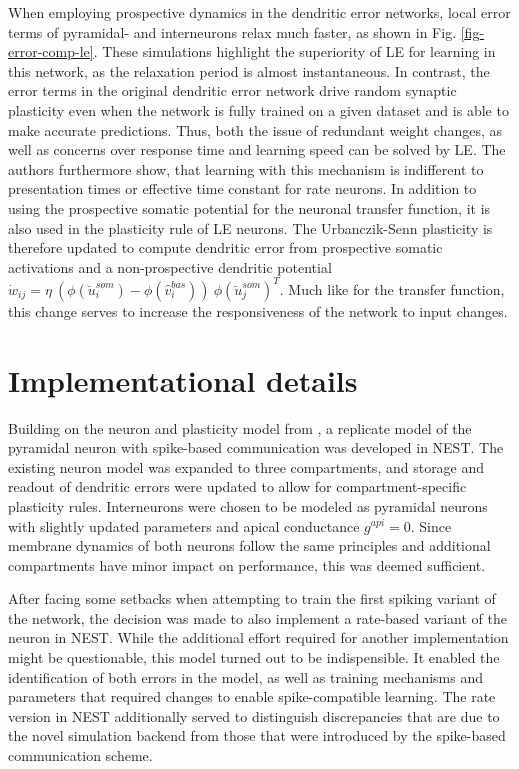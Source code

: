 When employing prospective dynamics in the dendritic error networks, local error terms of pyramidal- and interneurons
relax much faster, as shown in Fig. \ref{fig-error-comp-le}. These simulations highlight the superiority of LE for
learning in this network, as the relaxation period is almost instantaneous. In contrast, the error terms in the original
dendritic error network drive random synaptic plasticity even when the network is fully trained on a given dataset and
is able to make accurate predictions. Thus, both the issue of redundant weight changes, as well as concerns over
response time and learning speed can be solved by LE. The authors furthermore show, that learning with this mechanism is
indifferent to presentation times or effective time constant for rate neurons. In addition to using the prospective
somatic potential for the neuronal transfer function, it is also used in the plasticity rule of LE neurons. The
Urbanczik-Senn plasticity is therefore updated to compute dendritic error from prospective somatic activations and a
non-prospective dendritic potential $\dot{w}_{ij}= \eta \ ( \phi(\breve{u}_i^{som}) - \phi(\hat{v}_i^{bas}) ) \
  \phi(\breve{u}_j^{som})^T$. Much like for the transfer function, this change serves to increase the responsiveness of
the network to input changes.

\section{Implementational details}

Building on the neuron and plasticity model from \citep{Stapmanns2021}, a replicate model of the pyramidal neuron with
spike-based communication was developed in NEST. The existing neuron model was expanded to three compartments, and
storage and readout of dendritic errors were updated  to allow for compartment-specific plasticity rules. Interneurons
were chosen to be modeled as pyramidal neurons with slightly updated parameters and apical conductance $g^{api}=0$.
Since membrane dynamics of both neurons follow the same principles and additional compartments have minor impact on
performance, this was deemed sufficient.

After facing some setbacks when attempting to train the first spiking variant of the network, the decision was made to
also implement a rate-based variant of the neuron in NEST.  While the additional effort required for another
implementation might be questionable, this model turned out to be indispensible. It enabled the identification of both
errors in the model, as well as training mechanisms and parameters that required changes to enable spike-compatible
learning. The rate version in NEST additionally served to distinguish discrepancies that are due to the novel simulation
backend from those that were introduced by the spike-based communication scheme.

